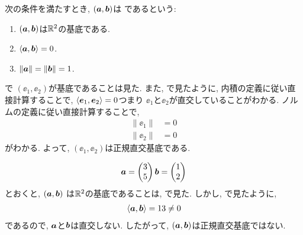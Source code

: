 \begin{definition}
  \label{def:orthonormal}
  次の条件を満たすとき,
  $(\boldsymbol{a},\boldsymbol{b})$は
 であるという:
  \begin{enumerate}
  \item   $(\boldsymbol{a},\boldsymbol{b})$は$\mathbb{R}^2$の基底である.
  \item $\Braket{\boldsymbol{a},\boldsymbol{b}}=0$.
  \item $\|\boldsymbol{a}\|=\|\boldsymbol{b}\|=1$.
  \end{enumerate}
\end{definition}
\begin{example}
  で
  $(\ee_1,\ee_2)$が基底であることは見た.
  また, で見たように,
  内積の定義に従い直接計算することで,
  $\Braket{\boldsymbol{e}_1,\boldsymbol{e}_2}=0$つまり
  $\ee_1$と$\ee_2$が直交していることがわかる.
  ノルムの定義に従い直接計算することで,
  \begin{align*}
    \|\ee_1\|&=0\\
    \|\ee_2\|&=0
  \end{align*}
  がわかる.
  よって, 
  $(\ee_1,\ee_2)$は正規直交基底である.
\end{example}
\begin{example}
  \begin{align*}
    \boldsymbol{a}=\begin{pmatrix}3\\5\end{pmatrix}
    \boldsymbol{b}=\begin{pmatrix}1\\2\end{pmatrix}
  \end{align*}
  とおくと,
  $(\boldsymbol{a},\boldsymbol{b})$ は$\mathbb{R}^2$の基底であることは,
  で見た.
  しかし,
  で見たように,
  \begin{align*}
    \Braket{\boldsymbol{a},\boldsymbol{b}}=13\neq 0
  \end{align*}
  であるので,
  $\boldsymbol{a}$と$\boldsymbol{b}$は直交しない.
  したがって, $(\boldsymbol{a},\boldsymbol{b})$は正規直交基底ではない.
\end{example}

